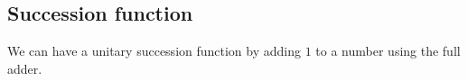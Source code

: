 
\subsection{Succession function}

We can have a unitary succession function by adding \(1\) to a number using the full adder.
